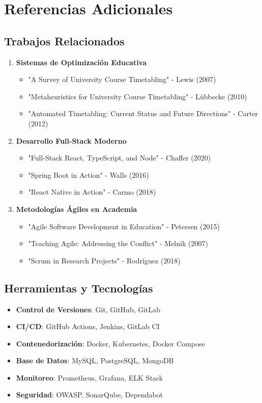 \section{Referencias Adicionales}

\subsection{Trabajos Relacionados}

\begin{enumerate}
\item \textbf{Sistemas de Optimización Educativa}
   \begin{itemize}
   \item "A Survey of University Course Timetabling" - Lewis (2007)
   \item "Metaheuristics for University Course Timetabling" - Lübbecke (2010)
   \item "Automated Timetabling: Current Status and Future Directions" - Carter (2012)
   \end{itemize}

\item \textbf{Desarrollo Full-Stack Moderno}
   \begin{itemize}
   \item "Full-Stack React, TypeScript, and Node" - Chaffer (2020)
   \item "Spring Boot in Action" - Walls (2016)
   \item "React Native in Action" - Carmo (2018)
   \end{itemize}

\item \textbf{Metodologías Ágiles en Academia}
   \begin{itemize}
   \item "Agile Software Development in Education" - Petersen (2015)
   \item "Teaching Agile: Addressing the Conflict" - Melnik (2007)
   \item "Scrum in Research Projects" - Rodríguez (2018)
   \end{itemize}
\end{enumerate}

\subsection{Herramientas y Tecnologías}

\begin{itemize}
\item \textbf{Control de Versiones}: Git, GitHub, GitLab
\item \textbf{CI/CD}: GitHub Actions, Jenkins, GitLab CI
\item \textbf{Contenedorización}: Docker, Kubernetes, Docker Compose
\item \textbf{Base de Datos}: MySQL, PostgreSQL, MongoDB
\item \textbf{Monitoreo}: Prometheus, Grafana, ELK Stack
\item \textbf{Seguridad}: OWASP, SonarQube, Dependabot
\end{itemize}

